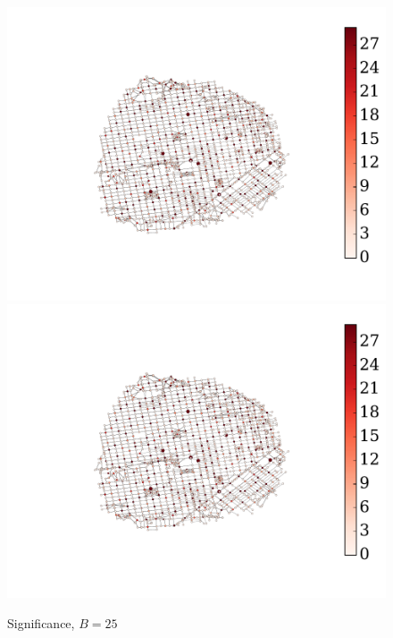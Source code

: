 \begin{figure} 
\begin{center}
\includegraphics[clip, trim=3.7cm 2.9cm 4.2cm 3cm,scale=0.8]{TexImg/sig_colapse.pdf}
\includegraphics[clip, trim=15cm 1.5cm 0.1cm 0.8cm,scale=0.45]{TexImg/sig_colapse.pdf}
\caption{Significance, $B=25$}\label{fig:sig_colapse}
\end{center}
\end{figure}

